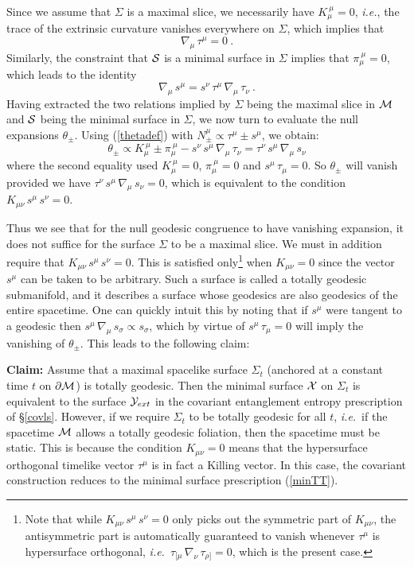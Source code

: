 \documentclass[12pt]{article}
\def\sec#1{\S \;\ref{#1}}
\def\req#1{(\ref{#1})}
\def\ie{{\it i.e.}}
\def\p{\partial}
\def\CS{{\cal S}}
\def\CX{{\cal X}}
\def\CY{{\cal Y}}
\def\p{\partial}
\def\p{\partial}
\def\bulk{{\cal M}}
\def\bdy{\p{\cal M}}
\def\ms{\CS}
\def\Lms{\CY}
\def\Xms{\CX}
\begin{document}
Since we assume that $\Sigma$ is a maximal slice, we necessarily have $K_\mu^{\ \mu} = 0$, \ie, the trace of the extrinsic curvature vanishes everywhere on $\Sigma$, which implies that %
\begin{equation}
\nabla_{\! \mu} \, \tau^\mu =0 \ .
\end{equation}
%
  Similarly, the constraint that $\ms$ is a minimal surface in $\Sigma$ implies that $\pi_\mu^{\ \mu}  =0$, which leads to the identity
%
\begin{equation}
\nabla_{\! \mu} \, s^\mu = s^\nu \, \tau^\mu \, \nabla_{\! \mu} \, \tau_\nu  \ .
\end{equation}
%
Having extracted the two relations implied by $\Sigma$ being the maximal slice in $\bulk$ and $\ms$ being the minimal surface in $\Sigma$, we now turn to evaluate the null expansions $\theta_{\pm}$.
Using  \req{thetadef} with $N_\pm^\mu \propto \tau^\mu \pm s^\mu$, we obtain:
%
\begin{equation}
\theta_\pm  \propto K_\mu^{\ \mu}\pm \pi_\mu^{\ \mu} - s^\nu \, s^\mu \, \nabla_{\! \mu}\, \tau_\nu =  \tau^\nu\, s^\mu\,\nabla_{\! \mu}\, s_\nu
\end{equation}
%
where the second equality used $K_\mu^{\ \mu}=0$, $\pi_\mu^{\ \mu}=0$ and $s^\mu\,\tau_\mu =0$.
So $\theta_\pm$ will vanish provided we
 have $ \tau^\nu\, s^\mu\,\nabla_{\! \mu}\, s_\nu =0$, which
is equivalent to the condition $K_{\mu\nu} \, s^\mu\,s^\nu =0$.

 Thus we see that for the null geodesic congruence to have vanishing expansion, it does not suffice for the surface $\Sigma$ to be a maximal slice. We must  in addition require that $K_{\mu\nu} \, s^\mu\,s^\nu =0$.
This is satisfied only\footnote{
Note that while $K_{\mu\nu} \, s^\mu\,s^\nu =0$ only picks out the symmetric part of $K_{\mu\nu}$, the antisymmetric part is automatically guaranteed to vanish whenever $\tau^{\mu}$ is hypersurface orthogonal, \ie\ $\tau_{[\mu} \, \nabla_{\! \nu} \, \tau_{\rho]} = 0$, which is the present case.
} when $K_{\mu\nu} =0$ since the vector $s^\mu$
can be taken to be arbitrary. Such a surface is called a totally
geodesic submanifold, and it describes a surface whose geodesics are also
geodesics of the entire spacetime. One can quickly intuit this by
noting that if $s^\mu$ were tangent to a geodesic then
$s^\mu\,\nabla_{\! \mu}\, s_\sigma \propto s_\sigma$, which by
virtue of $s^\mu\,\tau_\mu =0$ will imply the vanishing of
$\theta_\pm$. This leads to the following claim:

\noindent
{\bf Claim:} Assume that a maximal spacelike surface $\Sigma_t$
(anchored at a constant time $t$ on $\bdy$) is totally geodesic.
Then the minimal surface $\Xms$ on $\Sigma_t$ is equivalent to the
surface $\Lms_{ext}$ in the covariant entanglement entropy
prescription of \sec{covls}.
However, if we require $\Sigma_t$ to be totally geodesic for all $t$,
\ie\ if the spacetime $\bulk$ allows a totally geodesic foliation,
then the spacetime must be static.
This is because the condition $K_{\mu\nu}=0$ means that
the hypersurface orthogonal timelike vector
$\tau^\mu$ is in fact a Killing vector.
In this case, the covariant
construction reduces to the minimal surface
prescription \req{minTT}.
\end{document}
